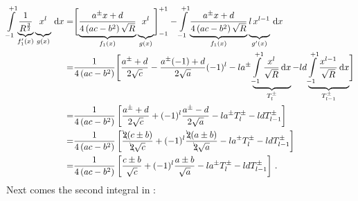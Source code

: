 \begin{align}
     \int\limits_{-1}^{+1}
       \underbrace{              \frac{1}{R^{\frac{3}{2}}}  }_{{f_1'}(x)}
       \underbrace{x^l \vphantom{\frac{1}{R^{\frac{3}{2}}}} }_{g(x)} \,\mathrm{d}x
  =&   \Biggl[ \underbrace{              \frac{a^{\pm}x + d}{4\left(ac-b^2\right)\sqrt{R}}  }_{f_1(x)}
               \underbrace{x^l \vphantom{\frac{a^{\pm}x + d}{4\left(ac-b^2\right)\sqrt{R}}} }_{g(x)}
       \Biggr]_{-1}^{+1}
     - \int\limits_{-1}^{+1}
         \underbrace{                       \frac{a^{\pm}x + d}{4\left(ac-b^2\right)\sqrt{R}}  }_{f_1(x)}
         \underbrace{l \, x^{l-1} \vphantom{\frac{a^{\pm}x + d}{4\left(ac-b^2\right)\sqrt{R}}} }_{{g'}(x)} \,\mathrm{d}x \nonumber \\
  =& \frac{1}{4\left(ac-b^2\right)} \Biggl[
       \frac{a^{\pm}     + d}{2\sqrt{c}}
     - \frac{a^{\pm}(-1) + d}{2\sqrt{a}} (-1)^l
     - l a^{\pm} \underbrace{\int\limits_{-1}^{+1} \frac{x^l    }{\sqrt{R}}\,\mathrm{d}x}_{T^{\pm}_l}
     - l d       \underbrace{\int\limits_{-1}^{+1} \frac{x^{l-1}}{\sqrt{R}}\,\mathrm{d}x}_{T^{\pm}_{l-1}}
     \Biggr] \nonumber \\
  =& \frac{1}{4\left(ac-b^2\right)} \left[
                \frac{a^{\pm} + d}{2\sqrt{c}}
       + (-1)^l \frac{a^{\pm} - d}{2\sqrt{a}}
       - l a^{\pm} T^{\pm}_l - l d T^{\pm}_{l-1} \right] \nonumber \\
  =& \frac{1}{4\left(ac-b^2\right)} \left[
                \frac{\bcancel{2}(c \pm b)}{\bcancel{2}\sqrt{c}}
       + (-1)^l \frac{\bcancel{2}(a \pm b)}{\bcancel{2}\sqrt{a}}
       - l a^{\pm} T^{\pm}_l - l d T^{\pm}_{l-1} \right] \nonumber \\
  =& \frac{1}{4\left(ac-b^2\right)} \left[
                \frac{c \pm b}{\sqrt{c}}
       + (-1)^l \frac{a \pm b}{\sqrt{a}}
       - l a^{\pm} T^{\pm}_l - l d T^{\pm}_{l-1} \right] \, .
\end{align}
Next comes the second integral in :

